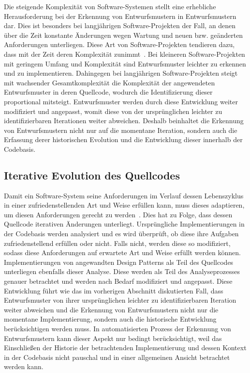 Die steigende Komplexität von Software-Systemen stellt eine erhebliche Herausforderung bei der Erkennung von Entwurfsmustern in Entwurfsmustern dar.
Dies ist besonders bei langjährigen Software-Projekten der Fall, an denen über die Zeit konstante Änderungen wegen Wartung und neuen bzw. geänderten Anforderungen unterliegen.
Diese Art von Software-Projekten tendieren dazu, dass mit der Zeit deren Komplexität zunimmt~\cite[S. 7]{Suh-2010}. 
Bei kleineren Software-Projekten mit geringem Umfang und Komplexität sind Entwurfsmuster leichter zu erkennen und zu implementieren.
Dahingegen bei langjährigen Software-Projekten steigt mit wachsender Gesamtkomplexität die Komplexität der angewendeten Entwurfsmuster in deren Quellcode, wodurch die Identifizierung dieser proportional mitsteigt.
Entwurfsmuster werden durch diese Entwicklung weiter modifiziert und angepasst, womit diese von der ursprünglichen leichter zu identifizierbaren Iterationen weiter abweichen. 
Deshalb beinhaltet die Erkennung von Entwurfsmustern nicht nur auf die momentane Iteration, sondern auch die Erfassung derer historischen Evolution und die Entwicklung dieser innerhalb der Codebasis.

\newpage

\subsection*{Iterative Evolution des Quellcodes}

Damit ein Software-System seine Anforderungen im Verlauf dessen Lebenszyklus in einer zufriedenstellenden Art und Weise erfüllen kann, muss dieses adaptieren, um diesen Anforderungen gerecht zu werden~\cite[S. 108]{10.1007/BFb0017737}.
Dies hat zu Folge, dass dessen Quellcode iterativen Änderungen unterliegt. Ursprüngliche Implementierungen in der Codebasis werden analysiert und es wird überprüft, ob diese ihre Aufgaben zufriedenstellend erfüllen oder nicht.
Falls nicht, werden diese so modifiziert, sodass diese Anforderungen auf erwartete Art und Weise erfüllt werden können. Implementierungen von angewandten Design Patterns als Teil des Quellcodes unterliegen ebenfalls dieser Analyse.
Diese werden als Teil des Analyseprozesses genauer betrachtet und werden nach Bedarf modifiziert und angepasst. Diese Entwicklung führt wie das im vorherigen Abschnitt diskutierten Fall, dass Entwurfsmuster von ihrer ursprünglichen leichter zu identifizierbaren
Iteration weiter abweichen und die Erkennung von Entwurfsmustern nicht nur die momentane Implementierung, sondern auch die historische Entwicklung berücksichtigen werden muss. In automatisierten Prozess der Erkennung von Entwurfsmustern kann dieser Aspekt nur bedingt berücksichtigt,
weil das Einschließen der Historie der betrachtenden Implementierung und dessen Kontext in der Codebasis nicht pauschal und in einer allgemeinen Ansicht betrachtet werden kann. 

